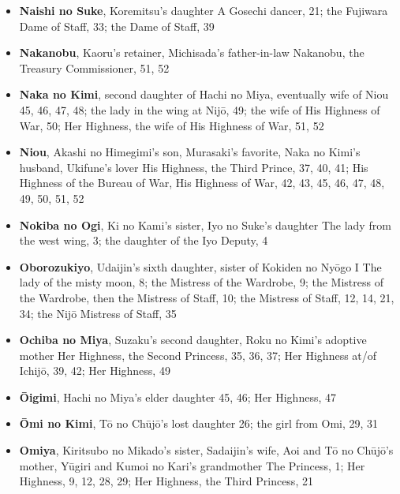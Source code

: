 \documentclass{article}
\begin{document}
\begin{multicols}{2}
\begin{itemize}[
			label=,
			leftmargin=0em,
			rightmargin=-1.5em,
			itemindent=-2em,
			nosep,
		]
		\item \textbf{Naishi no Suke}, Koremitsu's daughter A Gosechi dancer, 21;
		      the Fujiwara Dame of Staff, 33;
		      the Dame of Staff, 39

		\item \textbf{Nakanobu}, Kaoru's retainer, Michisada's father-in-law Nakanobu, the Treasury Commissioner, 51, 52

		\item \textbf{Naka no Kimi}, second daughter of Hachi no Miya, eventually wife of Niou 45, 46, 47, 48;
		      the lady in the wing at Nijō, 49;
		      the wife of His Highness of War, 50;
		      Her Highness, the wife of His Highness of War, 51, 52

		\item \textbf{Niou}, Akashi no Himegimi's son, Murasaki's favorite, Naka no Kimi's husband, Ukifune's lover His Highness, the Third Prince, 37, 40, 41;
		      His Highness of the Bureau of War, His Highness of War, 42, 43, 45, 46, 47, 48, 49, 50, 51, 52

		\item \textbf{Nokiba no Ogi}, Ki no Kami's sister, Iyo no Suke's daughter The lady from the west wing, 3;
		      the daughter of the Iyo Deputy, 4

		\item \textbf{Oborozukiyo}, Udaijin's sixth daughter, sister of Kokiden no Nyōgo I The lady of the misty moon, 8;
		      the Mistress of the Wardrobe, 9;
		      the Mistress of the Wardrobe, then the Mistress of Staff, 10;
		      the Mistress of Staff, 12, 14, 21, 34;
		      the Nijō Mistress of Staff, 35

		\item \textbf{Ochiba no Miya}, Suzaku's second daughter, Roku no Kimi's adoptive mother Her Highness, the Second Princess, 35, 36, 37;
		      Her Highness at/of Ichijō, 39, 42;
		      Her Highness, 49
		      
		\item \textbf{Ōigimi}, Hachi no Miya's elder daughter 45, 46;
		      Her Highness, 47
		      
		\item \textbf{Ōmi no Kimi}, Tō no Chūjō's lost daughter 26; 
		      the girl from Omi, 29, 31

		\item \textbf{Omiya}, Kiritsubo no Mikado's sister, Sadaijin's wife, Aoi and Tō no Chūjō's mother, Yūgiri and Kumoi no Kari's grandmother The Princess, 1;
		      Her Highness, 9, 12, 28, 29;
		      Her Highness, the Third Princess, 21


\end{itemize}
\end{multicols}
\end{document}
